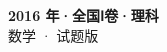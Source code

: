 \documentclass[zihao=-4, a4paper]{ctexart}
\begin{document}
\begin{center}
  {\Large\bfseries 2016 年·全国Ⅰ卷·理科}\\[4pt]
  {\large 数学 · 试题版}
\end{center}
\medskip
{}

\end{document}

